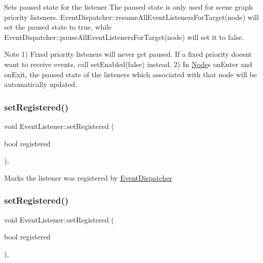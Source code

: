 Sets paused state for the listener The paused state is only used for scene graph priority listeners. {\ttfamily Event\+Dispatcher\+::resume\+All\+Event\+Listeners\+For\+Target(node)} will set the paused state to {\ttfamily true}, while {\ttfamily Event\+Dispatcher\+::pause\+All\+Event\+Listeners\+For\+Target(node)} will set it to {\ttfamily false}. \begin{DoxyNote}{Note}
1) Fixed priority listeners will never get paused. If a fixed priority doesn\textquotesingle{}t want to receive events, call {\ttfamily set\+Enabled(false)} instead. 2) In {\ttfamily \hyperlink{classNode}{Node}}\textquotesingle{}s on\+Enter and on\+Exit, the {\ttfamily paused state} of the listeners which associated with that node will be automatically updated. 
\end{DoxyNote}
\mbox{\label{classEventListener_afd6557f250049331bf58d5f291634b82}} 
\subsubsection{\texorpdfstring{set\+Registered()}{setRegistered()}\hspace{0.1cm}{\footnotesize\ttfamily [1/2]}}
{\footnotesize\ttfamily void Event\+Listener\+::set\+Registered (\begin{DoxyParamCaption}\item[{bool}]{registered }\end{DoxyParamCaption})\hspace{0.3cm}{\ttfamily [inline]}, {\ttfamily [protected]}}

Marks the listener was registered by \hyperlink{classEventDispatcher}{Event\+Dispatcher} \mbox{\label{classEventListener_afd6557f250049331bf58d5f291634b82}} 
\subsubsection{\texorpdfstring{set\+Registered()}{setRegistered()}\hspace{0.1cm}{\footnotesize\ttfamily [2/2]}}
{\footnotesize\ttfamily void Event\+Listener\+::set\+Registered (\begin{DoxyParamCaption}\item[{bool}]{registered }\end{DoxyParamCaption})\hspace{0.3cm}{\ttfamily [inline]}, {\ttfamily [protected]}}

